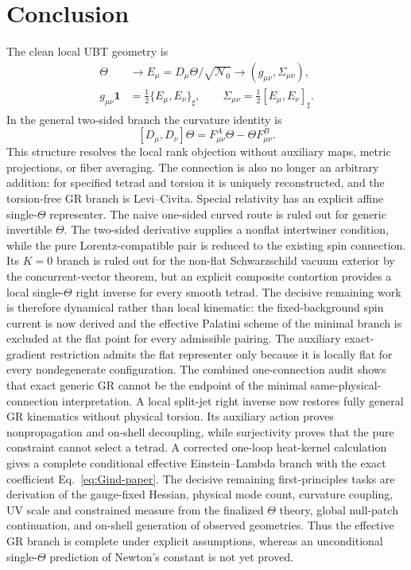 \documentclass[12pt,a4paper]{article}
\theoremstyle{remark}\newtheorem{remark}[definition]{Remark}
\begin{document}
\section{Conclusion}
The clean local UBT geometry is
\[
 \boxed{
 \begin{aligned}
 \Theta &\longrightarrow E_\mu=D_\mu\Theta/\sqrt{\mathcal N_0}
 \longrightarrow (g_{\mu\nu},\Sigma_{\mu\nu}),\\
 g_{\mu\nu}\mathbf1&=\tfrac12\{E_\mu,E_\nu\}_\sharp,
 \qquad
 \Sigma_{\mu\nu}=\tfrac12[E_\mu,E_\nu]_\sharp.
 \end{aligned}}
\]
In the general two-sided branch the curvature identity is
\[
 [D_\mu,D_\nu]\Theta=F^A_{\mu\nu}\Theta-\Theta F^B_{\mu\nu}.
\]
This structure resolves the local rank objection without auxiliary maps,
metric projections, or fiber averaging.  The connection is also no longer an
arbitrary addition: for specified tetrad and torsion it is uniquely
reconstructed, and the torsion-free GR branch is Levi--Civita.  Special
relativity has an explicit affine single-$\Theta$ representer.  The naive
one-sided curved route is ruled out for generic invertible $\Theta$.  The
two-sided derivative supplies a nonflat intertwiner condition, while the pure
Lorentz-compatible pair is reduced to the existing spin connection.  Its
$K=0$ branch is ruled out for the non-flat Schwarzschild vacuum exterior by
the concurrent-vector theorem, but an explicit composite contortion provides
a local single-$\Theta$ right inverse for every smooth tetrad.  The decisive
remaining work is therefore dynamical rather than local kinematic: the
fixed-background spin current is now derived and the effective Palatini
scheme of the minimal branch is excluded at the flat point for every
admissible pairing.  The auxiliary exact-gradient restriction admits the flat
representer only because it is locally flat for every nondegenerate
configuration.  The combined one-connection audit shows that exact generic GR cannot be the
endpoint of the minimal same-physical-connection interpretation.  A local
split-jet right inverse now restores fully general GR kinematics without
physical torsion.  Its auxiliary action proves nonpropagation and on-shell
decoupling, while surjectivity proves that the pure constraint cannot select a
tetrad.  A corrected one-loop heat-kernel calculation gives a complete
conditional effective Einstein--Lambda branch with the exact coefficient
Eq.~\eqref{eq:Gind-paper}.  The decisive remaining first-principles tasks are
derivation of the gauge-fixed Hessian, physical mode count, curvature coupling,
UV scale and constrained measure from the finalized $\Theta$ theory, global
null-patch continuation, and on-shell generation of observed geometries.  Thus
the effective GR branch is complete under explicit assumptions, whereas an
unconditional single-$\Theta$ prediction of Newton's constant is not yet
proved.
\end{document}
